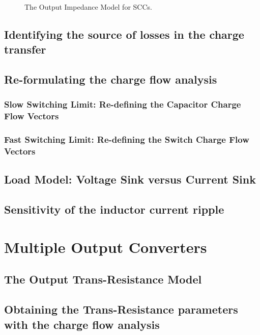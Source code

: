 \begin{figure}[!h]
\centering
%
\label{fig:SINE}
\caption{The Output Impedance Model for SCCs. }
\end{figure}






\subsection{Identifying the source of losses in the charge transfer}
\subsection{Re-formulating the charge flow analysis}
\subsubsection[SSL Capacitor Charge Flow]{Slow Switching Limit: Re-defining the Capacitor Charge Flow Vectors}
\subsubsection[FSL Switch Charge Flow]{Fast Switching Limit: Re-defining the Switch Charge Flow Vectors}

\subsection{Load Model: Voltage Sink versus Current Sink}
\subsection{Sensitivity of the inductor current ripple}

\section{Multiple Output Converters}
\subsection{The Output Trans-Resistance Model}
\subsection{Obtaining the Trans-Resistance parameters with the charge flow analysis }












